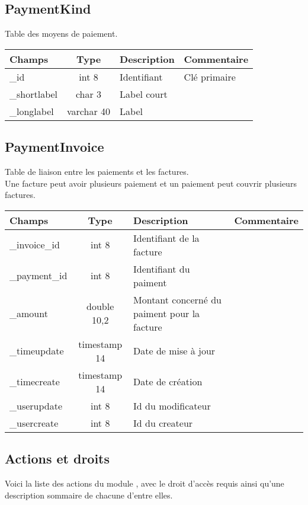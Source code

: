 \subsection{PaymentKind}
Table des moyens de paiement.\\

\begin{tabular}{|p{3cm}|c|p{5.4cm}|p{2.6cm}|}
\hline
\textbf{Champs} & \textbf{Type} & \textbf{Description} & \textbf{Commentaire} \\
\hline
\_id & int 8 & Identifiant & Clé primaire \\
\hline
\_shortlabel & char 3 & Label court & \\
\hline
\_longlabel & varchar 40 & Label & \\
\hline
\end{tabular}


\subsection{PaymentInvoice}
Table de liaison entre les paiements et les factures.\\
Une facture peut avoir plusieurs paiement et un paiement peut couvrir plusieurs factures.

\begin{tabular}{|p{3cm}|c|p{5.4cm}|p{2.6cm}|}
\hline
\textbf{Champs} & \textbf{Type} & \textbf{Description} & \textbf{Commentaire} \\
\hline
\_invoice\_id & int 8 & Identifiant de la facture & \\
\hline
\_payment\_id & int 8 & Identifiant du paiment & \\
\hline
\_amount & double 10,2 & Montant concerné du paiment pour la facture &\\
\hline
\_timeupdate & timestamp 14 & Date de mise à jour & \\
\hline
\_timecreate & timestamp 14 & Date de création & \\
\hline
\_userupdate & int 8 & Id du modificateur & \\
\hline
\_usercreate & int 8 & Id du createur & \\
\hline
\end{tabular}



\subsection{Actions et droits}

Voici la liste des actions du module \payment, avec le droit d'accès requis ainsi qu'une description sommaire de chacune d'entre elles.\\

